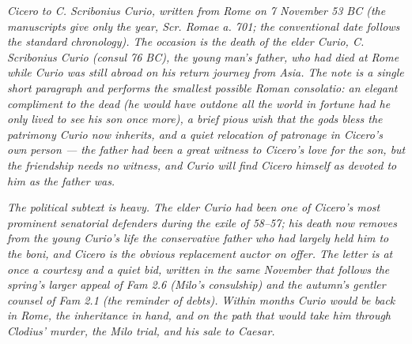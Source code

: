 
\textit{Cicero to C. Scribonius Curio, written from Rome on 7
November 53 BC (the manuscripts give only the year, \textit{Scr.
Romae a. 701}; the conventional date follows the standard
chronology). The occasion is the death of the elder Curio, C.
Scribonius Curio (consul 76 BC), the young man's father, who
had died at Rome while Curio was still abroad on his return
journey from Asia. The note is a single short paragraph and
performs the smallest possible Roman \textit{consolatio}: an
elegant compliment to the dead (he would have outdone all the
world in fortune had he only lived to see his son once more),
a brief pious wish that the gods bless the patrimony Curio now
inherits, and a quiet relocation of patronage in Cicero's own
person --- the father had been a great witness to Cicero's love
for the son, but the friendship needs no witness, and Curio
will find Cicero himself as devoted to him as the father was.}

\textit{The political subtext is heavy. The elder Curio had
been one of Cicero's most prominent senatorial defenders during
the exile of 58--57; his death now removes from the young
Curio's life the conservative father who had largely held him
to the \textit{boni}, and Cicero is the obvious replacement
\textit{auctor} on offer. The letter is at once a courtesy and
a quiet bid, written in the same November that follows the
spring's larger appeal of Fam 2.6 (Milo's consulship) and the
autumn's gentler counsel of Fam 2.1 (the reminder of debts).
Within months Curio would be back in Rome, the inheritance in
hand, and on the path that would take him through Clodius'
murder, the Milo trial, and his sale to Caesar.}
